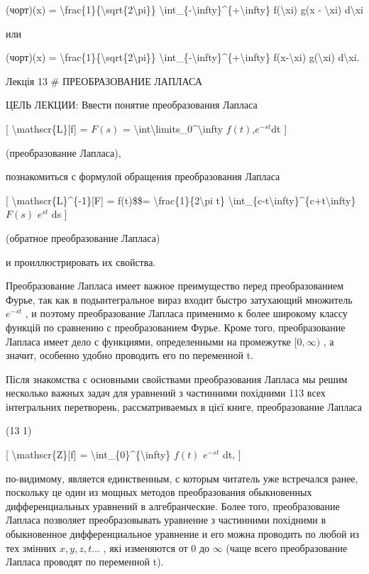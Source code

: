 \documentclass[
]{article}
\begin{document}
{{(чорт)(x) =
\textbackslash frac\{1\}\{\textbackslash sqrt\{2\textbackslash pi\}\}
\textbackslash int\_\{-\textbackslash infty\}\^{}\{+\textbackslash infty\}
f(\textbackslash xi) g(x - \textbackslash xi) d\textbackslash xi

или

(чорт)(x) =
\textbackslash frac\{1\}\{\textbackslash sqrt\{2\textbackslash pi\}\}
\textbackslash int\_\{-\textbackslash infty\}\^{}\{+\textbackslash infty\}
f(x-\textbackslash xi) g(\textbackslash xi) d\textbackslash xi.

Лекція 13 \# ПРЕОБРАЗОВАНИЕ ЛАПЛАСА

ЦЕЛЬ ЛЕКЦИИ: Ввести понятие преобразования Лапласа

{[} \textbackslash mathscr\{L\}{[}f{]} = \(F(s)\) =
\textbackslash int\textbackslash limits\_0\^{}\textbackslash infty
\(f(t)\),\(e^{-st}\)dt {]}

(преобразование Лапласа),

познакомиться с формулой обращения преобразования Лапласа

{[} \textbackslash mathscr\{L\}\^{}\{-1\}{[}F{]} = f(t)\$\$=
\textbackslash frac\{1\}\{2\textbackslash pi t\}
\textbackslash int\_\{c-t\textbackslash infty\}\^{}\{c+t\textbackslash infty\}
\(F(s)\) \(e^{st}\) ds {]}

(обратное преобразование Лапласа)

и проиллюстрировать их свойства.

Преобразование Лапласа имеет важное преимущество перед преобразованием
Фурье, так как в подынтегральное вираз входит быстро затухающий
множитель \(e^{-st}\) , и поэтому преобразование Лапласа применимо к
более широкому классу функцій по сравнению с преобразованием Фурье.
Кроме того, преобразование Лапласа имеет дело с функциями, определенными
на промежутке \([0, \infty)\) , а значит, особенно удобно проводить его
по переменной t.

Після знакомства с основными свойствами преобразования Лапласа мы решим
несколько важных задач для уравнений з частинними похідними 113 всех
інтегральних перетворень, рассматриваемых в цієї книге, преобразование
Лапласа

(13 1)

{[} \textbackslash mathscr\{Z\}{[}f{]} =
\textbackslash int\_\{0\}\^{}\{\textbackslash infty\} \(f(t)\)
\(e^{-st}\) dt, {]}

по-видимому, является единственным, с которым читатель уже встречался
ранее, поскольку це один из мощных методов преобразования обыкновенных
дифференциальных уравнений в алгебранческие. Более того, преобразование
Лапласа позволяет преобразовывать уравнение з частинними похідними в
обыкновенное дифференциальное уравнение и его можна проводить по любой
из тех змінних \(x, y, z, t \ldots\) , які изменяются от 0 до \(\infty\)
(чаще всего преобразование Лапласа проводят по переменной t).

}}
\end{document}
